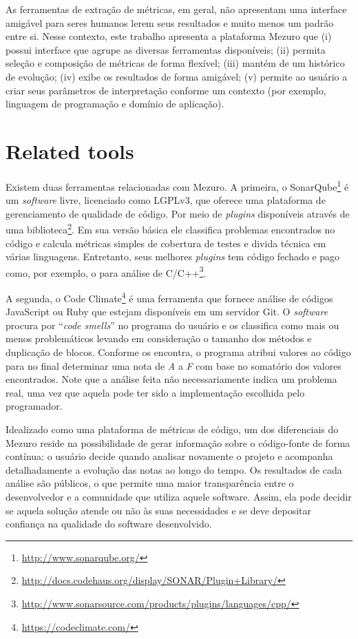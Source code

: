 \documentclass{llncs}
\begin{document}
As ferramentas de extração de métricas, em geral, não apresentam uma interface
amigável para seres humanos lerem seus resultados e muito menos um padrão entre
si.  Nesse contexto, este trabalho apresenta a plataforma Mezuro que
(i) possui interface que agrupe as diversas ferramentas disponíveis;
(ii) permita seleção e composição de métricas de forma flexível;
(iii) mantém de um histórico de evolução;
(iv) exibe os resultados de forma amigável;
(v) permite ao usuário a criar seus parâmetros de interpretação conforme um
contexto (por exemplo, linguagem de programação e domínio de aplicação).

\section{Related tools}

Existem duas ferramentas relacionadas com Mezuro. A primeira, o
SonarQube\footnote{\url{http://www.sonarqube.org/}} é um \textit{software}
livre, licenciado como LGPLv3, que oferece uma plataforma de gerenciamento de
qualidade de código. Por meio de \textit{plugins} disponíveis através de uma
biblioteca\footnote{\url{http://docs.codehaus.org/display/SONAR/Plugin+Library/}}.
Em sua versão básica ele classifica problemas encontrados no código e calcula
métricas simples de cobertura de testes e divida técnica em várias linguagens.
Entretanto, seus melhores \textit{plugins} tem código fechado e pago como, por
exemplo, o para análise de
C/C++\footnote{\url{http://www.sonarsource.com/products/plugins/languages/cpp/}}.

A segunda, o Code Climate\footnote{\url{https://codeclimate.com/}} é uma
ferramenta que fornece análise de códigos JavaScript ou Ruby que estejam
disponíveis em um servidor Git. O \textit{software} procura por ``\textit{code
smells}'' no programa do usuário e os classifica como mais ou menos
problemáticos levando em consideração o tamanho dos métodos e duplicação de
blocos. Conforme os encontra, o programa atribui valores ao código para no
final determinar uma nota de \textit{A} a \textit{F} com base no somatório dos
valores encontrados. Note que a análise feita não necessariamente indica um
problema real, uma vez que aquela pode ter sido a implementação escolhida pelo
programador.

Idealizado como uma plataforma de métricas de código, um dos diferenciais do
Mezuro reside na possibilidade de gerar informação sobre o código-fonte de
forma contínua: o usuário decide quando analisar novamente o projeto e
acompanha detalhadamente a evolução das notas ao longo do tempo. Os resultados
de cada análise são públicos, o que permite uma maior transparência entre o
desenvolvedor e a comunidade que utiliza aquele software. Assim, ela
pode decidir se aquela solução atende ou não às suas necessidades e se deve
depositar confiança na qualidade do software desenvolvido.
\end{document}
